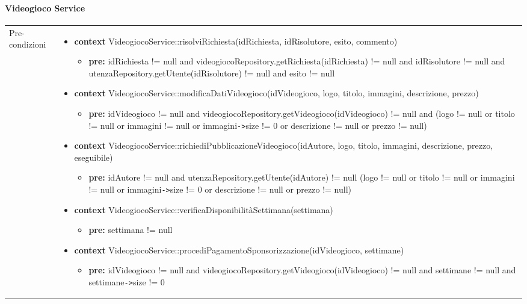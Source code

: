 \paragraph{Videogioco Service}
\small\begin{tabular}{|| l | p{28em} ||} 
	\hline
	Pre-condizioni & \begin{itemize}[leftmargin=*]
		\item \textbf{context} VideogiocoService::risolviRichiesta(idRichiesta, idRisolutore, esito, commento)
		\begin{itemize}
			\item[ ] \textbf{pre:} idRichiesta != null and videogiocoRepository.getRichiesta(idRichiesta) != null and idRisolutore != null and utenzaRepository.getUtente(idRisolutore) != null and esito != null
		\end{itemize}

		\item \textbf{context} VideogiocoService::modificaDatiVideogioco(idVideogioco, logo, titolo, immagini, descrizione, prezzo)
		\begin{itemize}
			\item[ ] \textbf{pre:} idVideogioco != null and videogiocoRepository.getVideogioco(idVideogioco) != null and (logo != null or titolo != null or immagini != null or immagini\verb|->|size != 0 or descrizione != null or prezzo != null)
		\end{itemize}

		\item \textbf{context} VideogiocoService::richiediPubblicazioneVideogioco(idAutore, logo, titolo, immagini, descrizione, prezzo, eseguibile)
		\begin{itemize}
			\item[ ] \textbf{pre:} idAutore != null and utenzaRepository.getUtente(idAutore) != null (logo != null or titolo != null or immagini != null or immagini\verb|->|size != 0 or descrizione != null or prezzo != null)
		\end{itemize}

		\item \textbf{context} VideogiocoService::verificaDisponibilitàSettimana(settimana)
		\begin{itemize}
			\item[ ] \textbf{pre:} settimana != null
		\end{itemize}

		\item \textbf{context} VideogiocoService::procediPagamentoSponsorizzazione(idVideogioco, settimane)
		\begin{itemize}
			\item[ ] \textbf{pre:} idVideogioco != null and videogiocoRepository.getVideogioco(idVideogioco) != null and settimane != null and settimane\verb|->|size != 0 
		\end{itemize}


\end{itemize}
\end{tabular}
